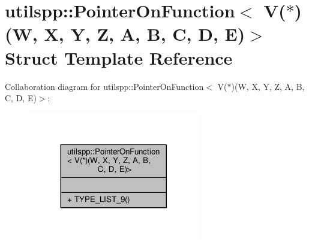 \hypertarget{structutilspp_1_1PointerOnFunction_3_01V_07_5_08_07W_00_01X_00_01Y_00_01Z_00_01A_00_01B_00_01C_00_01D_00_01E_08_4}{\section{utilspp\-:\-:Pointer\-On\-Function$<$ V($\ast$)(W, X, Y, Z, A, B, C, D, E)$>$ Struct Template Reference}
\label{structutilspp_1_1PointerOnFunction_3_01V_07_5_08_07W_00_01X_00_01Y_00_01Z_00_01A_00_01B_00_01C_00_01D_00_01E_08_4}
}


Collaboration diagram for utilspp\-:\-:Pointer\-On\-Function$<$ V($\ast$)(W, X, Y, Z, A, B, C, D, E)$>$\-:\nopagebreak
\begin{figure}[H]
\begin{center}
\leavevmode
\includegraphics[width=212pt]{structutilspp_1_1PointerOnFunction_3_01V_07_5_08_07W_00_01X_00_01Y_00_01Z_00_01A_00_01B_00_01C_00_01D_00_01E_08_4__coll__graph}
\end{center}
\end{figure}
